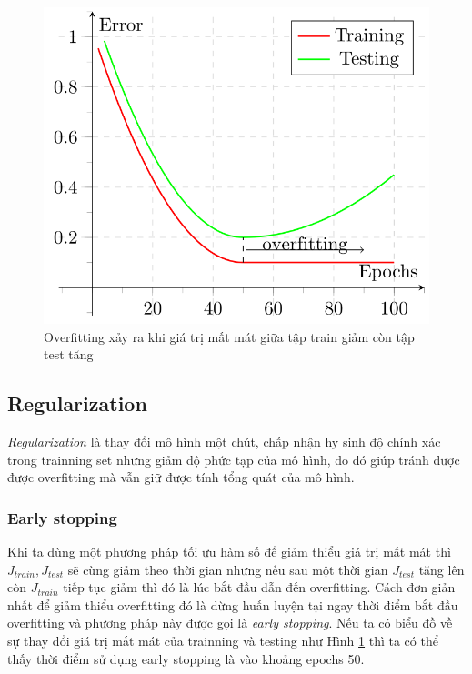 \begin{center}
 	\begin{figure}[H]
    \begin{center}
    \includegraphics[scale=0.5]{chap3/image/overfittingError.png}
    \end{center}
    \caption{Overfitting xảy ra khi giá trị mất mát giữa tập train giảm còn tập test tăng}
    \label{fig:overfittingError}
    \end{figure}
\end{center}

\subsection{Regularization}

\textit{Regularization} là thay đổi mô hình một chút, chấp nhận hy sinh độ chính xác trong trainning set nhưng giảm độ phức tạp của mô hình, do đó giúp tránh được được overfitting mà vẫn giữ được tính tổng quát của mô hình.
\subsubsection{Early stopping}
Khi ta dùng một phương pháp tối ưu hàm số để giảm thiểu giá trị mất mát thì \textit{$J_{train}, J_{test}$} sẽ cùng giảm theo thời gian nhưng nếu sau một thời gian \textit{$J_{test}$} tăng lên còn \textit{$J_{train}$} tiếp tục giảm thì đó là lúc bắt đầu dẫn đến overfitting. Cách đơn giản nhất để giảm thiểu overfitting đó là dừng huấn luyện tại ngay thời điểm bắt đầu overfitting và phương pháp này được gọi là \textit{early stopping}. Nếu ta có biểu đồ về sự thay đổi giá trị mất mát của trainning và testing như Hình \ref{fig:overfittingError} thì ta có thể thấy thời điểm sử dụng early stopping là vào khoảng epochs 50.
